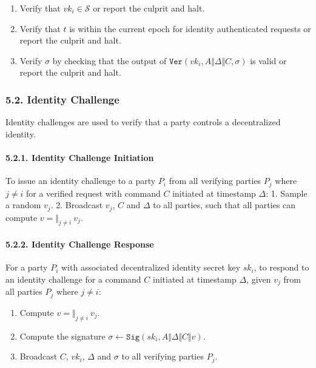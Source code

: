 \documentclass[
]{article}
\providecommand{\tightlist}{%
  \setlength{\itemsep}{0pt}\setlength{\parskip}{0pt}}
\begin{document}
\begin{enumerate}
\def\labelenumi{\arabic{enumi}.}
\tightlist
\item
  Verify that \(vk_i \in \mathcal{S}\) or report the culprit and halt.
\item
  Verify that \(t\) is within the current epoch for identity
  authenticated requests or report the culprit and halt.
\item
  Verify \(\sigma\) by checking that the output of
  \(\mathtt{Ver}(vk_i, A \Vert \Delta \Vert C, \sigma)\) is valid or
  report the culprit and halt.
\end{enumerate}

\hypertarget{identity-challenge}{%
\subsubsection{5.2. Identity Challenge}\label{identity-challenge}}

Identity challenges are used to verify that a party controls a
decentralized identity.

\hypertarget{identity-challenge-initiation}{%
\paragraph{5.2.1. Identity Challenge
Initiation}\label{identity-challenge-initiation}}

To issue an identity challenge to a party \(P_i\) from all verifying
parties \(P_j\) where \(j \neq i\) for a verified request with command
\(C\) initiated at timestamp \(\Delta\): 1. Sample a random \(v_j\). 2.
Broadcast \(v_j\), \(C\) and \(\Delta\) to all parties, such that all
parties can compute \(v = \Vert _{j \neq i} \: v_j\).

\hypertarget{identity-challenge-response}{%
\paragraph{5.2.2. Identity Challenge
Response}\label{identity-challenge-response}}

For a party \(P_i\) with associated decentralized identity secret key
\(sk_i\), to respond to an identity challenge for a command \(C\)
initiated at timestamp \(\Delta\), given \(v_j\) from all parties
\(P_j\) where \(j \neq i\):

\begin{enumerate}
\def\labelenumi{\arabic{enumi}.}
\tightlist
\item
  Compute \(v = \Vert _{j \neq i} \: v_j\).
\item
  Compute the signature
  \(\sigma \leftarrow \mathtt{Sig}(sk_i, A \Vert \Delta \Vert C \Vert v)\).
\item
  Broadcast \(C\), \(vk_i\), \(\Delta\) and \(\sigma\) to all verifying
  parties \(P_j\).
\end{enumerate}
\end{document}
